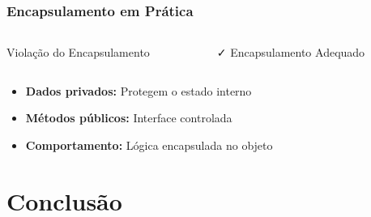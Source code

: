 \documentclass[aspectratio=169]{beamer}
\begin{document}
\begin{frame}
\frametitle{Encapsulamento em Prática}

\begin{columns}
\begin{column}{0.5\textwidth}
\begin{block}{\textcolor{cleanred}{\faTimes} Violação do Encapsulamento}

\end{block}
\end{column}

\begin{column}{0.5\textwidth}
\begin{block}{\textcolor{cleangreen}{\faCheck} Encapsulamento Adequado}

\end{block}
\end{column}
\end{columns}

\vspace{0.5cm}
\begin{itemize}
    \item \textbf{Dados privados:} Protegem o estado interno
    \item \textbf{Métodos públicos:} Interface controlada
    \item \textbf{Comportamento:} Lógica encapsulada no objeto
\end{itemize}
\end{frame}

\section{Conclusão}
\end{document}
